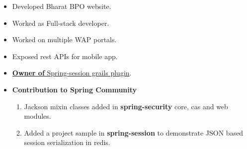 \documentclass[10pt,a4paper,ragged2e]{colorcv}
\begin{document}
    \divider

    \begin{itemize}
        \item Developed Bharat BPO website.
        \item Worked as Full-stack developer.
        \item Worked on multiple WAP portals.
        \item Exposed rest APIs for mobile app.
    \end{itemize}

    \divider

    \begin{itemize}
        \item \href{https://plugins.grails.org/plugin/jeetmp3/spring-session}{\textbf{Owner of} Spring-session grails plugin}.
        \item \textbf{Contribution to Spring Community}
        \begin{enumerate}
            \item \small Jackson mixin classes added in \textbf{spring-security} core, cas and web modules.
            \item Added a project sample in \textbf{spring-session} to demonstrate JSON based session
            serialization in redis.
        \end{enumerate}
    \end{itemize}
\end{document}

